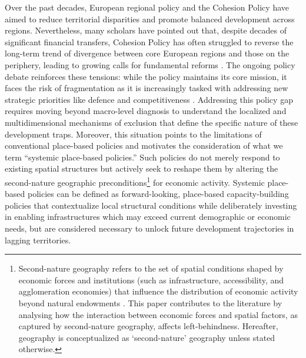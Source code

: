 \documentclass[a4paper,11pt,oneside]{article}
\begin{document}
\begin{sloppypar}





Over the past decades, European regional policy \citep{fratesi2023regional} and the Cohesion Policy \citep{rodriguez2021does,di_caro_fratesi2022one,bourdin2025impacts} have aimed to reduce territorial disparities and promote balanced development across regions. Nevertheless, many scholars have pointed out that, despite decades of significant financial transfers, Cohesion Policy has often struggled to reverse the long-term trend of divergence between core European regions and those on the periphery, leading to growing calls for fundamental reforms \citep{rodriguez_pose2018revenge}. The ongoing policy debate \citep{rodriguez2025forging} reinforces these tensions: while the policy maintains its core mission, it faces the risk of fragmentation as it is increasingly tasked with addressing new strategic priorities like defence and competitiveness \citep{ECA2025}. Addressing this policy gap requires moving beyond macro-level diagnosis to understand the localized and multidimensional mechanisms of exclusion that define the specific nature of these development traps. Moreover, this situation points to the limitations of conventional place-based policies \citep{barca2009agenda,fratesi2023regional} and motivates the consideration of what we term ``systemic place-based policies.'' Such policies do not merely respond to existing spatial structures but actively seek to reshape them by altering the second-nature geographic preconditions\footnote{Second-nature geography refers to the set of spatial conditions shaped by economic forces and institutions (such as infrastructure, accessibility, and agglomeration economies) that influence the distribution of economic activity beyond natural endowments \citep[see, among others,][]{fujita2004new}. This paper contributes to the literature by analysing how the interaction between economic forces and spatial factors, as captured by second-nature geography, affects left-behindness. Hereafter, geography is conceptualized as ‘second-nature’ geography unless stated otherwise.} for economic activity. Systemic place-based policies can be defined as forward-looking, place-based capacity-building policies that contextualize local structural conditions while deliberately investing in enabling infrastructures which may exceed current demographic or economic needs, but are considered necessary to unlock future development trajectories in lagging territories.



\end{sloppypar}
\end{document}
